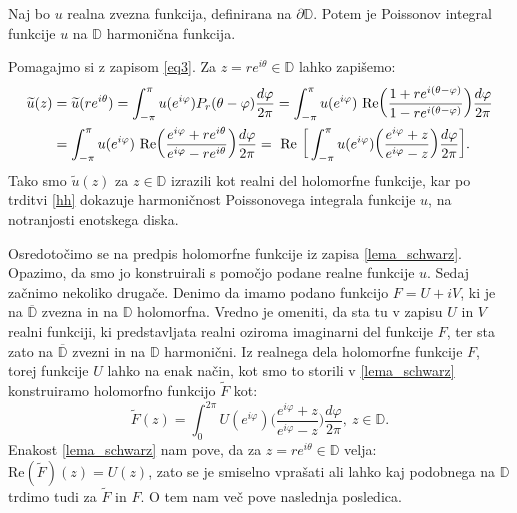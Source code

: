 \documentclass[mat1]{fmfdelo}
\begin{document}
     \begin{lema}
        \label{realnidel}
        Naj bo $u$ realna zvezna funkcija, definirana na $\partial \mathbb{D}$. Potem je Poissonov integral funkcije $u$ na $\mathbb{D}$ harmonična funkcija.
     \end{lema}
     \begin{dokaz}
        Pomagajmo si z zapisom \eqref{eq3}. Za $z = re^{i\theta} \in \mathbb{D}$ lahko zapišemo:
            \begin{align}
                \label{lema_schwarz}
                \widetilde{u}(z) &= \widetilde{u}(r e^{i \theta}) = \int_{-\pi}^{\pi}{u(e^{i \varphi}) P_r(\theta - \varphi)\frac{d \varphi}{2 \pi}} = \int_{-\pi}^{\pi}{u(e^{i \varphi})~\text{Re}\bigg(\frac{1+re^{i(\theta - \varphi)}}{1-re^{i(\theta - \varphi)}}\bigg)\frac{d \varphi}{2 \pi}} \notag \\
                &= \int_{-\pi}^{\pi}{u(e^{i \varphi})~\text{Re}\bigg(\frac{e^{i\varphi}+re^{i\theta}}{e^{i\varphi}-re^{i\theta}}\bigg)\frac{d \varphi}{2 \pi}}=~\text{Re}~\bigg[\int_{-\pi}^{\pi}{u(e^{i \varphi})\bigg(\frac{e^{i\varphi}+z}{e^{i\varphi}-z}\bigg)\frac{d \varphi}{2 \pi}}\bigg].
            \end{align}
        Tako smo $\widetilde{u}(z)$ za $z \in \mathbb{D}$ izrazili kot realni del holomorfne funkcije, kar po trditvi \ref{hh} dokazuje harmoničnost Poissonovega integrala funkcije $u$, na notranjosti enotskega diska.
     \end{dokaz}

     Osredotočimo se na predpis holomorfne funkcije iz zapisa \eqref{lema_schwarz}. Opazimo, da smo jo konstruirali s pomočjo podane realne funkcije $u$. 
     Sedaj začnimo nekoliko drugače. Denimo da imamo podano funkcijo $F = U + iV$, ki je na $\overline{\mathbb{D}}$ zvezna in na $\mathbb{D}$ holomorfna. Vredno je omeniti, da sta tu v zapisu $U$ in $V$ realni funkciji, ki predstavljata realni oziroma imaginarni del funkcije $F$, ter sta zato na $\overline{\mathbb{D}}$ zvezni in na $\mathbb{D}$ harmonični.
     Iz realnega dela holomorfne funkcije $F$, torej funkcije $U$ lahko na enak način, kot smo to storili v \eqref{lema_schwarz} konstruiramo holomorfno funkcijo $\widetilde{F}$ kot:
     \begin{equation}
        \label{priprav_schwarz}
        \widetilde{F}(z) = \int_{0}^{2 \pi}{U(e^{i \varphi})\bigg(\frac{e^{i\varphi}+z}{e^{i\varphi}-z}\bigg)\frac{d \varphi}{2 \pi}},~z \in \mathbb{D}.
    \end{equation}
    Enakost \eqref{lema_schwarz} nam pove, da za $z = r e^{i\theta}\in \mathbb{D}$ velja: $\text{Re}(\widetilde{F})(z) = U(z)$, zato se je smiselno vprašati ali lahko kaj podobnega na $\mathbb{D}$ trdimo tudi za $\widetilde{F}$ in $F$. 
    O tem nam več pove naslednja posledica. 
\end{document}
